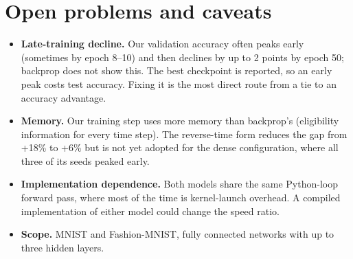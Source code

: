 \documentclass{article}
\begin{document}
\section*{Open problems and caveats}

{\small
\begin{itemize}
  \item \textbf{Late-training decline.} Our validation accuracy often peaks early (sometimes by epoch 8--10) and
    then declines by up to 2 points by epoch 50; backprop does not show this. The best checkpoint is reported, so an
    early peak costs test accuracy. Fixing it is the most direct route from a tie to an accuracy advantage.
  \item \textbf{Memory.} Our training step uses more memory than backprop's (eligibility information for every
    time step). The reverse-time form reduces the gap from +18\% to +6\% but is not yet adopted for the dense
    configuration, where all three of its seeds peaked early.
  \item \textbf{Implementation dependence.} Both models share the same Python-loop forward pass, where most of the
    time is kernel-launch overhead. A compiled implementation of either model could change the speed ratio.
  \item \textbf{Scope.} MNIST and Fashion-MNIST, fully connected networks with up to three hidden layers.
\end{itemize}
}
\end{document}
